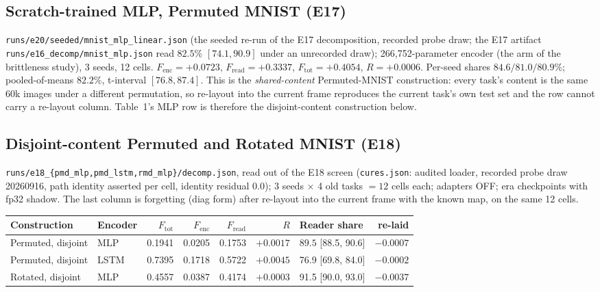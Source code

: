 \subsection{Scratch-trained MLP, Permuted MNIST (E17)}

\texttt{runs/e20/seeded/mnist\_mlp\_linear.json} (the seeded re-run of the
E17 decomposition, recorded probe draw; the E17 artifact
\texttt{runs/e16\_decomp/mnist\_mlp.json} read $82.5\%$ $[74.1, 90.9]$ under an
unrecorded draw); 266{,}752-parameter encoder (the arm of the brittleness
study), 3 seeds, 12 cells. $F_{\mathrm{enc}} = +0.0723$,
$F_{\mathrm{read}} = +0.3337$, $F_{\mathrm{tot}} = +0.4054$, $R = +0.0006$.
Per-seed shares $84.6 / 81.0 / 80.9\%$; pooled-of-means $\mathbf{82.2\%}$,
t-interval $[76.8, 87.4]$. This is the \emph{shared-content} Permuted-MNIST
construction: every task's content is the same 60k images under a different
permutation, so re-layout into the current frame reproduces the current
task's own test set and the row cannot carry a re-layout column. Table~1's
MLP row is therefore the disjoint-content construction below.

\subsection{Disjoint-content Permuted and Rotated MNIST (E18)}

\texttt{runs/e18\_\{pmd\_mlp,pmd\_lstm,rmd\_mlp\}/decomp.json}, read out of the
E18 screen (\texttt{cures.json}: audited loader, recorded probe draw 20260916,
path identity asserted per cell, identity residual $0.0$); 3 seeds $\times$ 4
old tasks $= 12$ cells each; adapters OFF; era checkpoints with fp32 shadow.
The last column is forgetting (diag form) after re-layout into the current
frame with the known map, on the same 12 cells.

\begin{center}\small
\begin{tabular}{@{}llrrrrlr@{}}
\toprule
Construction & Encoder & $F_{\mathrm{tot}}$ & $F_{\mathrm{enc}}$ & $F_{\mathrm{read}}$ & $R$ & Reader share & re-laid \\
\midrule
Permuted, disjoint & MLP & 0.1941 & 0.0205 & 0.1753 & $+0.0017$ & $\mathbf{89.5}$ [88.5, 90.6] & $-0.0007$ \\
Permuted, disjoint & LSTM & 0.7395 & 0.1718 & 0.5722 & $+0.0045$ & 76.9 [69.8, 84.0] & $-0.0002$ \\
Rotated, disjoint & MLP & 0.4557 & 0.0387 & 0.4174 & $+0.0003$ & 91.5 [90.0, 93.0] & $-0.0037$ \\
\bottomrule
\end{tabular}
\end{center}

